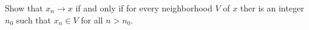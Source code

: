 Show that $x_n\to x$ if and only if for every neighborhood $V$ of $x$ ther is an integer $n_0$ such that
$x_n\in V$ for all $n>n_0$.\\